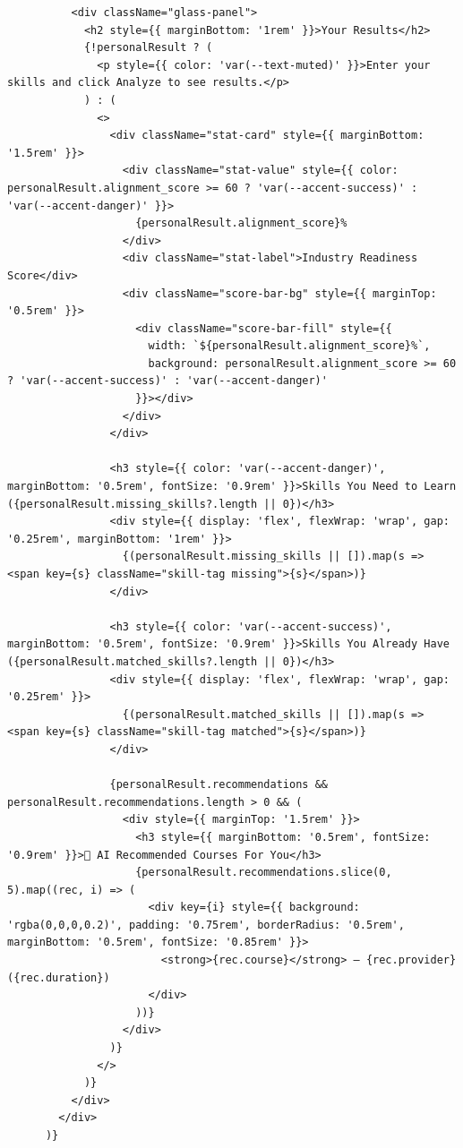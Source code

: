 \documentclass[12pt,a4paper]{report}
\begin{document}
\begin{verbatim}
          <div className="glass-panel">
            <h2 style={{ marginBottom: '1rem' }}>Your Results</h2>
            {!personalResult ? (
              <p style={{ color: 'var(--text-muted)' }}>Enter your skills and click Analyze to see results.</p>
            ) : (
              <>
                <div className="stat-card" style={{ marginBottom: '1.5rem' }}>
                  <div className="stat-value" style={{ color: personalResult.alignment_score >= 60 ? 'var(--accent-success)' : 'var(--accent-danger)' }}>
                    {personalResult.alignment_score}%
                  </div>
                  <div className="stat-label">Industry Readiness Score</div>
                  <div className="score-bar-bg" style={{ marginTop: '0.5rem' }}>
                    <div className="score-bar-fill" style={{
                      width: `${personalResult.alignment_score}%`,
                      background: personalResult.alignment_score >= 60 ? 'var(--accent-success)' : 'var(--accent-danger)'
                    }}></div>
                  </div>
                </div>

                <h3 style={{ color: 'var(--accent-danger)', marginBottom: '0.5rem', fontSize: '0.9rem' }}>Skills You Need to Learn ({personalResult.missing_skills?.length || 0})</h3>
                <div style={{ display: 'flex', flexWrap: 'wrap', gap: '0.25rem', marginBottom: '1rem' }}>
                  {(personalResult.missing_skills || []).map(s => <span key={s} className="skill-tag missing">{s}</span>)}
                </div>

                <h3 style={{ color: 'var(--accent-success)', marginBottom: '0.5rem', fontSize: '0.9rem' }}>Skills You Already Have ({personalResult.matched_skills?.length || 0})</h3>
                <div style={{ display: 'flex', flexWrap: 'wrap', gap: '0.25rem' }}>
                  {(personalResult.matched_skills || []).map(s => <span key={s} className="skill-tag matched">{s}</span>)}
                </div>

                {personalResult.recommendations && personalResult.recommendations.length > 0 && (
                  <div style={{ marginTop: '1.5rem' }}>
                    <h3 style={{ marginBottom: '0.5rem', fontSize: '0.9rem' }}>🧠 AI Recommended Courses For You</h3>
                    {personalResult.recommendations.slice(0, 5).map((rec, i) => (
                      <div key={i} style={{ background: 'rgba(0,0,0,0.2)', padding: '0.75rem', borderRadius: '0.5rem', marginBottom: '0.5rem', fontSize: '0.85rem' }}>
                        <strong>{rec.course}</strong> — {rec.provider} ({rec.duration})
                      </div>
                    ))}
                  </div>
                )}
              </>
            )}
          </div>
        </div>
      )}


\end{verbatim}
\end{document}
